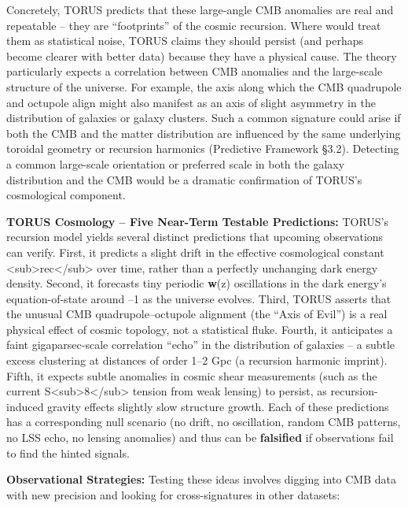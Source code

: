 \documentclass[
]{article}
\begin{document}
Concretely, TORUS predicts that these large-angle CMB anomalies are real
and repeatable -- they are ``footprints'' of the cosmic recursion. Where
\LambdaCDM would treat them as statistical noise, TORUS claims they should
persist (and perhaps become clearer with better data) because they have
a physical cause. The theory particularly expects a correlation between
CMB anomalies and the large-scale structure of the universe. For
example, the axis along which the CMB quadrupole and octupole align
might also manifest as an axis of slight asymmetry in the distribution
of galaxies or galaxy clusters. Such a common signature could arise if
both the CMB and the matter distribution are influenced by the same
underlying toroidal geometry or recursion harmonics (Predictive
Framework §3.2). Detecting a common large-scale orientation or preferred
scale in both the galaxy distribution and the CMB would be a dramatic
confirmation of TORUS's cosmological component.

\textbf{TORUS Cosmology -- Five Near-Term Testable Predictions:} TORUS's
recursion model yields several distinct predictions that upcoming
observations can verify. First, it predicts a slight drift in the
effective cosmological constant
\Lambda\textless sub\textgreater rec\textless/sub\textgreater{} over time,
rather than a perfectly unchanging dark energy density. Second, it
forecasts tiny periodic \textbf{w}(z) oscillations in the dark energy's
equation-of-state around --1 as the universe evolves. Third, TORUS
asserts that the unusual CMB quadrupole--octupole alignment (the ``Axis
of Evil'') is a real physical effect of cosmic topology, not a
statistical fluke. Fourth, it anticipates a faint gigaparsec-scale
correlation ``echo'' in the distribution of galaxies -- a subtle excess
clustering at distances of order 1--2 Gpc (a recursion harmonic
imprint). Fifth, it expects subtle anomalies in cosmic shear
measurements (such as the current
S\textless sub\textgreater8\textless/sub\textgreater{} tension from weak
lensing) to persist, as recursion-induced gravity effects slightly slow
structure growth. Each of these predictions has a corresponding null
scenario (no drift, no oscillation, random CMB patterns, no LSS echo, no
lensing anomalies) and thus can be \textbf{falsified} if observations
fail to find the hinted signals.

\textbf{Observational Strategies:} Testing these ideas involves digging
into CMB data with new precision and looking for cross-signatures in
other datasets:
\end{document}
